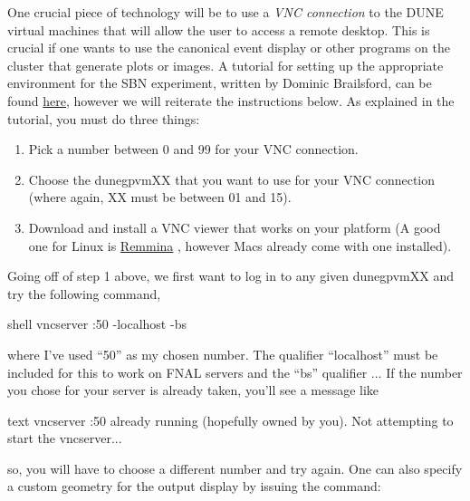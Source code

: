\documentclass[8pt]{refart}
\begin{document}
One crucial piece of technology will be to use a \textit{VNC connection} to the DUNE virtual machines that will allow the user to access a remote desktop.  This is crucial if one wants to use the canonical event display or other programs on the cluster that generate plots or images.  A tutorial for setting up the appropriate environment for the SBN experiment, written by Dominic Brailsford, can be found \href{https://sbnsoftware.github.io/sbndcode_wiki/Viewing_events_remotely_with_VNC.html}{here}, however we will reiterate the instructions below.  As explained in the tutorial, you must do three things:
\begin{enumerate}
    \item Pick a number between 0 and 99 for your VNC connection.
    \item Choose the dunegpvmXX that you want to use for your VNC connection (where again, XX must be between 01 and 15).
    \item Download and install a VNC viewer that works on your platform (A good one for Linux is \href{https://remmina.org/}{Remmina} \cite{remmina}, however Macs already come with one installed).
\end{enumerate}
Going off of step 1 above, we first want to log in to any given dunegpvmXX and try the following command,
\begin{code}{shell}
vncserver :50 -localhost -bs
\end{code}
where I've used ``50'' as my chosen number.  The qualifier ``localhost'' must be included for this to work on FNAL servers and the ``bs'' qualifier ...  If the number you chose for your server is already taken, you'll see a message like
\begin{code}{text}
vncserver :50 already running (hopefully owned by you).  Not attempting to start the vncserver...
\end{code}
so, you will have to choose a different number and try again.  One can also specify a custom geometry for the output display by issuing the command:
\end{document}
